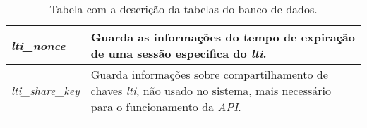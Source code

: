 \begin{anexosenv}
\begin{longtable}{|p{}|p{}|}
        \hline \textit{lti\_nonce}&
        Guarda as informações do tempo de expiração de uma sessão especifica do \textit{lti}.
        \\
        
        \hline \textit{lti\_share\_key} &
        Guarda informações sobre compartilhamento de chaves \textit{lti}, não usado no sistema, mais necessário para o funcionamento da \textit{API}.
        \\
        \hline 
        \caption{Tabela com a descrição da tabelas do banco de dados.}
        \label{tbl:estrutura-banco-dados}
    \end{longtable} 

\end{anexosenv}